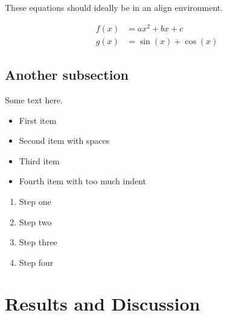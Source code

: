 \documentclass{article}
\begin{document}
These equations should ideally be in an align environment.

\begin{equation}
  \begin{aligned}
    f(x) &= ax ^ 2 + bx + c \\
    g(x) &= \sin(x) + \cos(x)
  \end{aligned}
\end{equation}

  \subsection{Another subsection}

Some text here.

  \begin{itemize}
\item First item
       \item    Second item with spaces
  \item Third item
                \item Fourth item with too much indent
  \end{itemize}

\begin{enumerate}
    \item Step one
 \item  Step two
\item Step three
                \item Step four
  \end{enumerate}

  \section{   Results and   Discussion   }
\end{document}
